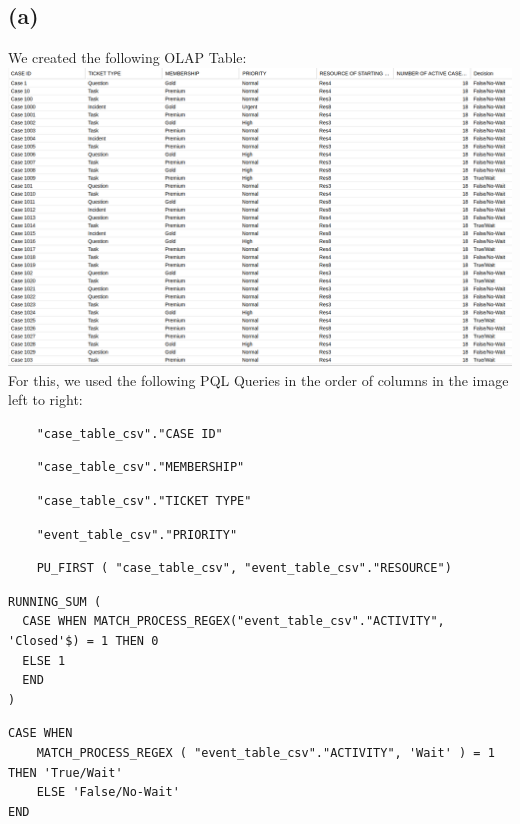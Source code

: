 \documentclass[../../main.tex]{subfiles}
\begin{document}
\subsection*{(a)}
We created the following OLAP Table:\\
\includegraphics[width=\columnwidth]{img/Celonis_a_OLAP_Table.png}\\
For this, we used the following PQL Queries in the order of columns in the image left to right:
\begin{verbatim}
	"case_table_csv"."CASE ID"
\end{verbatim}
\begin{verbatim}
	"case_table_csv"."MEMBERSHIP"
\end{verbatim}
\begin{verbatim}
	"case_table_csv"."TICKET TYPE"
\end{verbatim}
\begin{verbatim}
	"event_table_csv"."PRIORITY"
\end{verbatim}
\begin{verbatim}
	PU_FIRST ( "case_table_csv", "event_table_csv"."RESOURCE")
\end{verbatim}
\begin{verbatim}
RUNNING_SUM (
  CASE WHEN MATCH_PROCESS_REGEX("event_table_csv"."ACTIVITY", 'Closed'$) = 1 THEN 0
  ELSE 1
  END
)
\end{verbatim}
\begin{verbatim}
CASE WHEN
	MATCH_PROCESS_REGEX ( "event_table_csv"."ACTIVITY", 'Wait' ) = 1 THEN 'True/Wait'
	ELSE 'False/No-Wait'
END
\end{verbatim}
\end{document}
